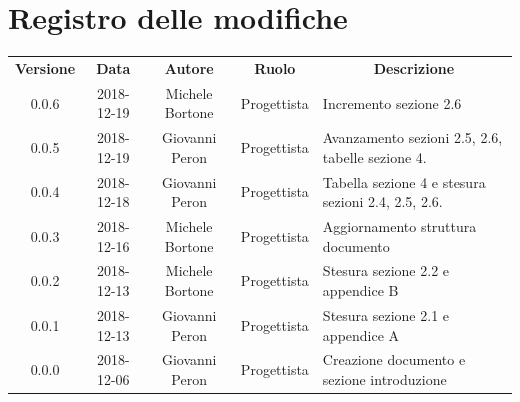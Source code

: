 \documentclass[11pt,a4paper]{article}
\begin{document}
	
	\newpage
	\section*{\centering Registro delle modifiche}
	\begin{tabularx}{\textwidth}{ c | c | c | c | X }
		\rowcolor{LightBlue}
		\color{white}\bfseries Versione & \color{white}\bfseries Data & \color{white}\bfseries Autore & \color{white}\bfseries Ruolo & \multicolumn{1}{c}{\color{white}\bfseries Descrizione}\\[0.25cm]
		0.0.6 & 2018-12-19 & Michele Bortone & Progettista & Incremento sezione 2.6\\
		0.0.5 & 2018-12-19 & Giovanni Peron & Progettista & Avanzamento sezioni 2.5, 2.6, tabelle sezione 4.\\
		0.0.4 & 2018-12-18 & Giovanni Peron & Progettista & Tabella sezione 4 e stesura sezioni 2.4, 2.5, 2.6.\\
		0.0.3 & 2018-12-16 & Michele Bortone & Progettista & Aggiornamento struttura documento\\
		0.0.2 & 2018-12-13 & Michele Bortone & Progettista & Stesura sezione 2.2  e appendice B\\
		0.0.1 & 2018-12-13 & Giovanni Peron & Progettista & Stesura sezione 2.1 e appendice A \\
		0.0.0 & 2018-12-06 & Giovanni Peron & Progettista & Creazione documento e
sezione introduzione \\
	\end{tabularx}
	\newpage
	\tableofcontents
	\newpage
		
	\newpage
	
	\newpage
	
	\newpage
	
	\newpage
		
\end{document}
